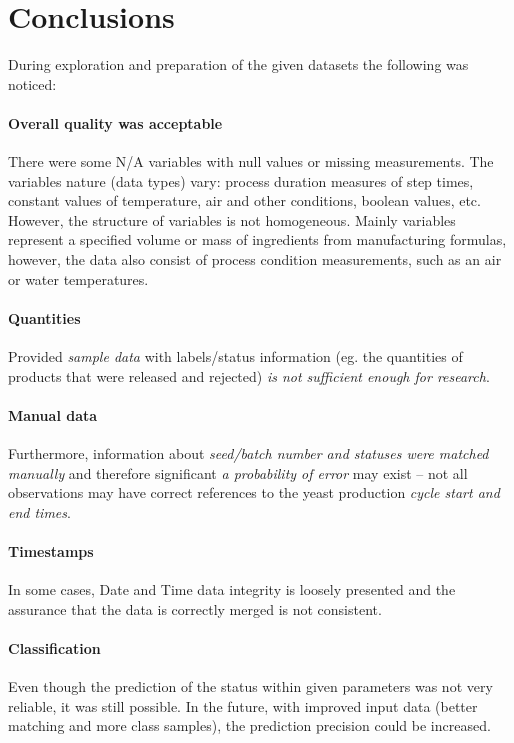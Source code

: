 \section{Conclusions}
\label{sec:conclusions}
During exploration and preparation of the given datasets the following was noticed:

\paragraph{Overall quality was acceptable} There were some N/A variables with null values or missing measurements. The variables nature (data types) vary: process duration measures of step times, constant values of temperature, air and other conditions, boolean values, etc. However, the structure of variables is not homogeneous. Mainly variables represent a specified volume or mass of ingredients from manufacturing formulas, however, the data also consist of process condition measurements, such as an air or water temperatures.
    
\paragraph{Quantities} Provided \emph{sample data} with labels/status information (eg. the quantities of products that were released and rejected) \emph{is not sufficient enough for research}. 
    
\paragraph{Manual data} Furthermore, information about \emph{seed/batch number and statuses were matched manually} and therefore significant \emph{a probability of error} may exist – not all observations may have correct references to the yeast production \emph{cycle start and end times}.
    
\paragraph{Timestamps} In some cases, Date and Time data integrity is loosely presented and the assurance that the data is correctly merged is not consistent.
    
\paragraph{Classification} Even though the prediction of the status within given parameters was not very reliable, it was still possible. In the future, with improved input data (better matching and more class samples), the prediction precision could be increased.

